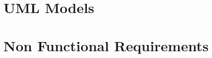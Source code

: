 \documentclass[]{report}
\begin{document}
\section{UML Models}


\section{Non Functional Requirements}


%
%
%
%
%
%
%
%
%
\end{document}
